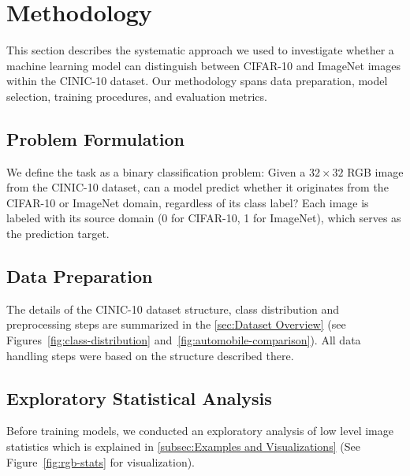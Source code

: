 \section{Methodology}

This section describes the systematic approach we used to investigate whether a machine learning model can distinguish between CIFAR-10 and 
ImageNet images within the CINIC-10 dataset. Our methodology spans data preparation, model selection, training procedures, and evaluation metrics.

\subsection{Problem Formulation}
We define the task as a binary classification problem: Given a $32 \times 32$ RGB image from the CINIC-10 dataset, can a model predict whether it 
originates from the CIFAR-10 or ImageNet domain, regardless of its class label? Each image is labeled with its source domain (0 for CIFAR-10, 1 for 
ImageNet), which serves as the prediction target.

\subsection{Data Preparation}
The details of the CINIC-10 dataset structure, class distribution and preprocessing steps are summarized in the \autoref{sec:Dataset Overview} (see Figures~\ref{fig:class-distribution} and~\ref{fig:automobile-comparison}). 
All data handling steps were based on the structure described there.

\subsection{Exploratory Statistical Analysis}
Before training models, we conducted an exploratory analysis of low level image statistics which is explained in \autoref{subsec:Examples and Visualizations}
(See Figure~\ref{fig:rgb-stats} for visualization).

